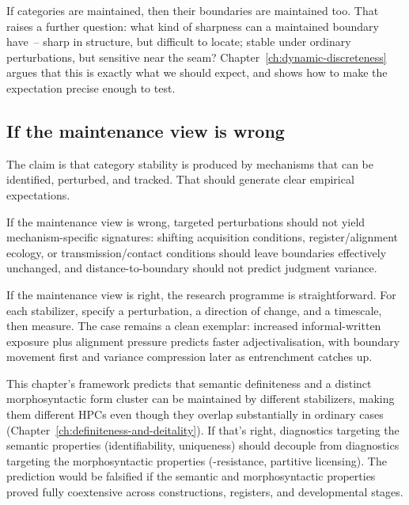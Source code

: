 If categories are maintained, then their boundaries are maintained too. That raises a further question: what kind of sharpness can a maintained boundary have~-- sharp in structure, but difficult to locate; stable under ordinary perturbations, but sensitive near the seam? Chapter~\ref{ch:dynamic-discreteness} argues that this is exactly what we should expect, and shows how to make the expectation precise enough to test.

\subsection{If the maintenance view is wrong}
\label{subsec:4:falsification}

The claim is that category stability is produced by mechanisms that can be identified, perturbed, and tracked. That should generate clear empirical expectations.

If the maintenance view is wrong, targeted perturbations should not yield mechanism-specific signatures: shifting acquisition conditions, register/alignment ecology, or transmission/contact conditions should leave boundaries effectively unchanged, and distance-to-boundary should not predict judgment variance.

If the maintenance view is right, the research programme is straightforward. For each stabilizer, specify a perturbation, a direction of change, and a timescale, then measure. The  case remains a clean exemplar: increased informal-written exposure plus alignment pressure predicts faster adjectivalisation, with boundary movement first and variance compression later as entrenchment catches up.

\begin{definitenessthread}
This chapter's framework predicts that semantic definiteness and a distinct morphosyntactic form cluster can be maintained by different stabilizers, making them different HPCs even though they overlap substantially in ordinary cases (Chapter~\ref{ch:definiteness-and-deitality}). If that's right, diagnostics targeting the semantic properties (identifiability, uniqueness) should decouple from diagnostics targeting the morphosyntactic properties (-resistance, partitive licensing). The prediction would be falsified if the semantic and morphosyntactic properties proved fully coextensive across constructions, registers, and developmental stages.
\end{definitenessthread}
